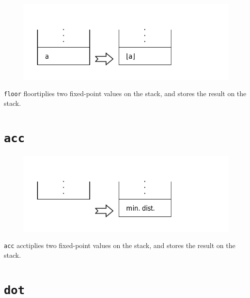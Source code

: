 	\begin{figure}
		\begin{flushright}
			\includegraphics[width=0.9\linewidth]{figure/pdf/i_floor} 
		\end{flushright}
	\end{figure}

		\texttt{floor} floortiplies two fixed-point values on the stack, and stores
		the result on the stack.

\section*{\texttt{acc}}

	\begin{figure}
		\begin{flushright}
			\includegraphics[width=0.9\linewidth]{figure/pdf/i_acc} 
		\end{flushright}
	\end{figure}

		\texttt{acc} acctiplies two fixed-point values on the stack, and stores
		the result on the stack.

\section*{\texttt{dot}}

